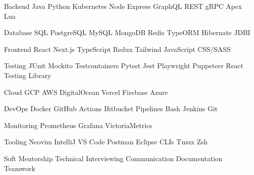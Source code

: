 

\begin{cvskills}

  \cvskill
    {Backend} %
    {Java \cpshalf Python \cpshalf Kubernetes \cpshalf Node \cpshalf Express \cpshalf GraphQL \cpshalf REST \cpshalf gRPC \cpshalf Apex \cpshalf Lua } %

  \cvskill
    {Database} %
    {SQL \cpshalf PostgreSQL \cpshalf MySQL \cpshalf MongoDB \cpshalf Redis \cpshalf TypeORM \cpshalf Hibernate \cpshalf JDBI} %

  \cvskill
    {Frontend} %
    {React \cpshalf Next.js \cpshalf TypeScript \cpshalf Redux \cpshalf Tailwind \cpshalf JavaScript \cpshalf CSS/SASS} %

  \cvskill
    {Testing} %
    {JUnit \cpshalf Mockito \cpshalf Testcontainers \cpshalf Pytest \cpshalf Jest \cpshalf Playwright \cpshalf Puppeteer \cpshalf React Testing Library} %

  \cvskill
    {Cloud} %
    {GCP \cpshalf AWS \cpshalf DigitalOcean \cpshalf Vercel \cpshalf Firebase \cpshalf Azure} %

  \cvskill
    {DevOps} %
    {Docker \cpshalf GitHub Actions \cpshalf Bitbucket Pipelines \cpshalf Bash \cpshalf Jenkins \cpshalf Git} %


  \cvskill
  {Monitoring} %
    {Prometheus \cpshalf Grafana \cpshalf VictoriaMetrics} %

  \cvskill
  {Tooling} %
    {Neovim \cpshalf IntelliJ \cpshalf VS Code \cpshalf Postman \cpshalf Eclipse \cpshalf CLIs \cpshalf Tmux \cpshalf Zsh} %

  \cvskill
  {Soft} %
    {Mentorship \cpshalf Technical Interviewing \cpshalf Communication \cpshalf Documentation \cpshalf Teamwork} %

\end{cvskills}
